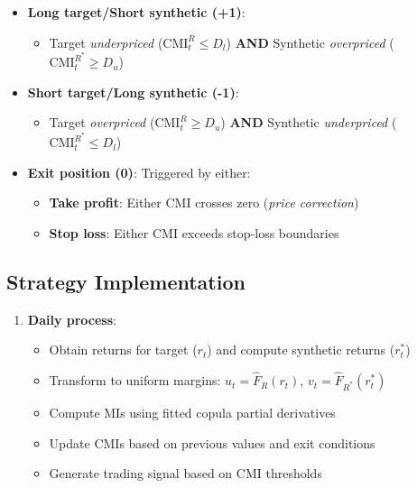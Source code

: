 \documentclass[
  letterpaper,
  DIV=11,
  numbers=noendperiod]{scrartcl}
\providecommand{\tightlist}{%
  \setlength{\itemsep}{0pt}\setlength{\parskip}{0pt}}\usepackage{longtable,booktabs,array}
\begin{document}
\begin{itemize}
\tightlist
\item
  \textbf{Long target/Short synthetic (+1)}:

  \begin{itemize}
  \tightlist
  \item
    Target \emph{underpriced} (\(\mathrm{CMI}_t^R \leq D_l\))
    \textbf{AND} Synthetic \emph{overpriced}
    (\(\mathrm{CMI}_t^{R^*} \geq D_u\))
  \end{itemize}
\end{itemize}

\begin{itemize}
\tightlist
\item
  \textbf{Short target/Long synthetic (-1)}:

  \begin{itemize}
  \tightlist
  \item
    Target \emph{overpriced} (\(\mathrm{CMI}_t^R \geq D_u\))
    \textbf{AND} Synthetic \emph{underpriced}
    (\(\mathrm{CMI}_t^{R^*} \leq D_l\))
  \end{itemize}
\end{itemize}

\begin{itemize}
\tightlist
\item
  \textbf{Exit position (0)}: Triggered by either:

  \begin{itemize}
  \tightlist
  \item
    \textbf{Take profit}: Either CMI crosses zero (\emph{price
    correction})
  \item
    \textbf{Stop loss}: Either CMI exceeds stop-loss boundaries
  \end{itemize}
\end{itemize}

\subsection{Strategy Implementation}\label{strategy-implementation}

\begin{enumerate}
\def\labelenumi{\arabic{enumi}.}
\tightlist
\item
  \textbf{Daily process}:

  \begin{itemize}
  \tightlist
  \item
    Obtain returns for target (\(r_t\)) and compute synthetic returns
    (\(r_t^*\))
  \item
    Transform to uniform margins: \(u_t = \hat{F}_R(r_t)\),
    \(v_t = \hat{F}_{R^*}(r_t^*)\)
  \item
    Compute MIs using fitted copula partial derivatives
  \item
    Update CMIs based on previous values and exit conditions
  \item
    Generate trading signal based on CMI thresholds
  \end{itemize}
\end{enumerate}
\end{document}
